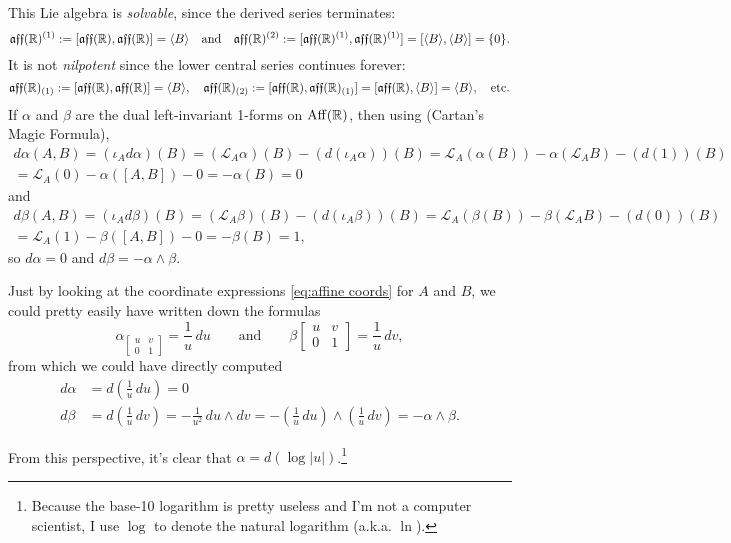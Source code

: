 \begin{example}
	This Lie algebra is \emph{solvable}, since the derived series terminates:
	\[
		\mathfrak{aff}(\mathbb{R})^{(1)} := [\mathfrak{aff}(\mathbb{R}),\mathfrak{aff}(\mathbb{R})] = \langle B \rangle \quad \text{and}\quad \mathfrak{aff}(\mathbb{R})^{(2)} := [\mathfrak{aff}(\mathbb{R})^{(1)},\mathfrak{aff}(\mathbb{R})^{(1)}] = [\langle B \rangle, \langle B \rangle] = \{0\}.
	\]
	It is not \emph{nilpotent} since the lower central series continues forever:
	\[
		\mathfrak{aff}(\mathbb{R})_{(1)} := [\mathfrak{aff}(\mathbb{R}),\mathfrak{aff}(\mathbb{R})] = \langle B \rangle, \quad  \mathfrak{aff}(\mathbb{R})_{(2)} := [\mathfrak{aff}(\mathbb{R}),\mathfrak{aff}(\mathbb{R})_{(1)}] = [\mathfrak{aff}(\mathbb{R}), \langle B \rangle] = \langle B \rangle, \quad \text{etc.}
	\]
	If $\alpha$ and $\beta$ are the dual left-invariant 1-forms on $\operatorname{Aff}(\mathbb{R})$, then using  (Cartan's Magic Formula),
	\begin{multline*}
		d\alpha(A,B) = (\iota_A d\alpha)(B) = (\mathcal{L}_A \alpha)(B) - (d(\iota_A\alpha))(B) = \mathcal{L}_A(\alpha(B)) - \alpha(\mathcal{L}_AB) - (d(1))(B) \\
		= \mathcal{L}_A(0) - \alpha([A,B]) - 0 = -\alpha(B) = 0
	\end{multline*}
	and
	\begin{multline*}
		d\beta(A,B) = (\iota_A d\beta)(B) = (\mathcal{L}_A \beta)(B) - (d(\iota_A\beta))(B) = \mathcal{L}_A(\beta(B)) - \beta(\mathcal{L}_AB) - (d(0))(B) \\
		= \mathcal{L}_A(1) - \beta([A,B]) - 0 = -\beta(B) = 1,
	\end{multline*}
	so $d\alpha = 0$ and $d\beta = -\alpha \wedge \beta$.
	
	Just by looking at the coordinate expressions \eqref{eq:affine coords} for $A$ and $B$, we could pretty easily have written down the formulas
	\[
		\alpha_{\begin{bmatrix} u & v \\ 0 & 1 \end{bmatrix}} = \frac{1}{u} \, du \qquad \text{and} \qquad \beta{\begin{bmatrix} u & v \\ 0 & 1 \end{bmatrix}} = \frac{1}{u} \, dv, 
	\]
	from which we could have directly computed
	\begin{align*}
		d\alpha & = d\left(\frac{1}{u} \, du\right) = 0 \\
		d\beta & = d\left(\frac{1}{u} \, dv\right) = -\frac{1}{u^2} \, du \wedge dv = -\left(\frac{1}{u} \, du \right) \wedge \left(\frac{1}{u} \, dv \right) = -\alpha \wedge \beta.
	\end{align*}
	
	From this perspective, it's clear that $\alpha = d(\log |u|)$.\footnote{Because the base-10 logarithm is pretty useless and I'm not a computer scientist, I use $\log$ to denote the natural logarithm (a.k.a. $\ln$).}
\end{example}

